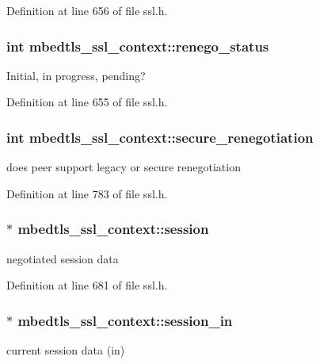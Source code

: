 Definition at line 656 of file ssl.\-h.

\hypertarget{structmbedtls__ssl__context_a2d0234b74d1f125e14e1b78a61db2edf}{
\subsubsection[{renego\-\_\-status}]{\setlength{\rightskip}{0pt plus 5cm}int mbedtls\-\_\-ssl\-\_\-context\-::renego\-\_\-status}}\label{structmbedtls__ssl__context_a2d0234b74d1f125e14e1b78a61db2edf}
Initial, in progress, pending? 

Definition at line 655 of file ssl.\-h.

\hypertarget{structmbedtls__ssl__context_ad7865b811cb03e5f4327102d555769d1}{
\subsubsection[{secure\-\_\-renegotiation}]{\setlength{\rightskip}{0pt plus 5cm}int mbedtls\-\_\-ssl\-\_\-context\-::secure\-\_\-renegotiation}}\label{structmbedtls__ssl__context_ad7865b811cb03e5f4327102d555769d1}
does peer support legacy or secure renegotiation 

Definition at line 783 of file ssl.\-h.

\hypertarget{structmbedtls__ssl__context_a2fc6ea9a1b644ee70bada085f89e3746}{
\subsubsection[{session}]{$\ast$ mbedtls\-\_\-ssl\-\_\-context\-::session}}\label{structmbedtls__ssl__context_a2fc6ea9a1b644ee70bada085f89e3746}
negotiated session data 

Definition at line 681 of file ssl.\-h.

\hypertarget{structmbedtls__ssl__context_a1a54dc6c582580371e94af230077dec1}{
\subsubsection[{session\-\_\-in}]{$\ast$ mbedtls\-\_\-ssl\-\_\-context\-::session\-\_\-in}}\label{structmbedtls__ssl__context_a1a54dc6c582580371e94af230077dec1}
current session data (in) 

